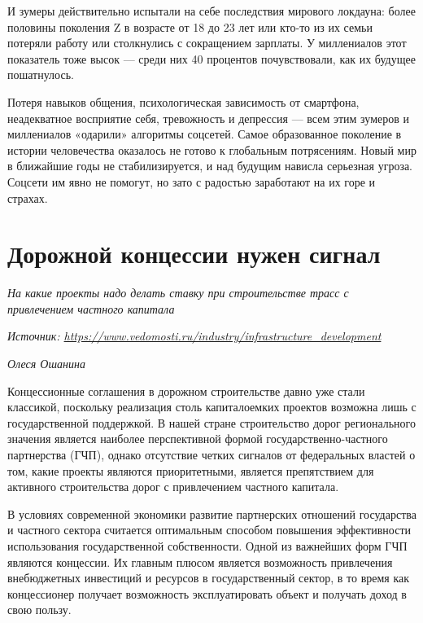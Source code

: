 И зумеры действительно испытали на себе последствия мирового локдауна: более половины поколения Z в возрасте от 18 до 23 лет или кто-то из их семьи потеряли работу или столкнулись с сокращением зарплаты. У миллениалов этот показатель тоже высок — среди них 40 процентов почувствовали, как их будущее пошатнулось.

Потеря навыков общения, психологическая зависимость от смартфона, неадекватное восприятие себя, тревожность и депрессия — всем этим зумеров и миллениалов «одарили» алгоритмы соцсетей. Самое образованное поколение в истории человечества оказалось не готово к глобальным потрясениям. Новый мир в ближайшие годы не стабилизируется, и над будущим нависла серьезная угроза. Соцсети им явно не помогут, но зато с радостью заработают на их горе и страхах.

\clearpage


\section{Дорожной концессии нужен сигнал}

\textit{На какие проекты надо делать ставку при строительстве трасс с привлечением частного капитала}

\textit{Источник: \url{https://www.vedomosti.ru/industry/infrastructure_development}}

\textit{Олеся Ошанина}

Концессионные соглашения в дорожном строительстве давно уже стали классикой, поскольку реализация столь капиталоемких проектов возможна лишь с государственной поддержкой. В нашей стране строительство дорог регионального значения является наиболее перспективной формой государственно-частного партнерства (ГЧП), однако отсутствие четких сигналов от федеральных властей о том, какие проекты являются приоритетными, является препятствием для активного строительства дорог с привлечением частного капитала.

В условиях современной экономики развитие партнерских отношений государства и частного сектора считается оптимальным способом повышения эффективности использования государственной собственности. Одной из важнейших форм ГЧП являются концессии. Их главным плюсом является возможность привлечения внебюджетных инвестиций и ресурсов в государственный сектор, в то время как концессионер получает возможность эксплуатировать объект и получать доход в свою пользу.

